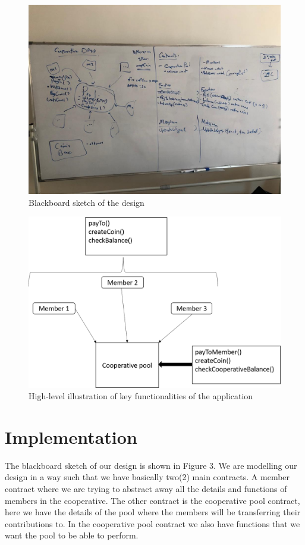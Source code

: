 \documentclass{article}
\begin{document}
\begin{flushleft}
\begin{figure}[H]
\centering
\includegraphics[scale=0.4]{design}
\caption{Blackboard sketch of the design}
\label{fig:dessign}
\end{figure}

\begin{figure}[H]
\centering
\includegraphics[scale=0.4]{KeyFunct.png}
\caption{High-level illustration of key functionalities of the application}
\label{fig:dessign}
\end{figure}

\section{Implementation}
The blackboard sketch of our design is shown in Figure 3. We are modelling our design in a way such that we have basically two(2) main contracts. A member contract where we are trying to abstract away all the details and functions of members in the cooperative. The other contract is the cooperative pool contract, here we have the details of the pool where the members will be transferring their contributions to. In the cooperative pool contract we also have functions that we want the pool to be able to perform. 


\end{flushleft}
\end{document}

